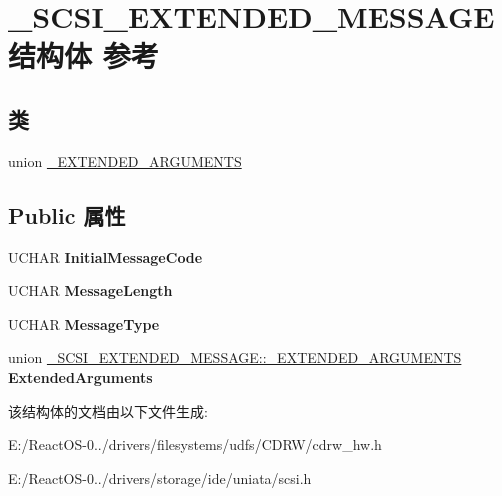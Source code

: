 \hypertarget{struct___s_c_s_i___e_x_t_e_n_d_e_d___m_e_s_s_a_g_e}{}\section{\+\_\+\+S\+C\+S\+I\+\_\+\+E\+X\+T\+E\+N\+D\+E\+D\+\_\+\+M\+E\+S\+S\+A\+G\+E结构体 参考}
\label{struct___s_c_s_i___e_x_t_e_n_d_e_d___m_e_s_s_a_g_e}
\subsection*{类}
\begin{DoxyCompactItemize}
\item 
union \hyperlink{union___s_c_s_i___e_x_t_e_n_d_e_d___m_e_s_s_a_g_e_1_1___e_x_t_e_n_d_e_d___a_r_g_u_m_e_n_t_s}{\+\_\+\+E\+X\+T\+E\+N\+D\+E\+D\+\_\+\+A\+R\+G\+U\+M\+E\+N\+TS}
\end{DoxyCompactItemize}
\subsection*{Public 属性}
\begin{DoxyCompactItemize}
\item 
\mbox{\label{struct___s_c_s_i___e_x_t_e_n_d_e_d___m_e_s_s_a_g_e_a3b00773a141e84dd943eed392e27b71b}} 
U\+C\+H\+AR {\bfseries Initial\+Message\+Code}
\item 
\mbox{\label{struct___s_c_s_i___e_x_t_e_n_d_e_d___m_e_s_s_a_g_e_a7496ac3fa1ec621221225ea8cf238159}} 
U\+C\+H\+AR {\bfseries Message\+Length}
\item 
\mbox{\label{struct___s_c_s_i___e_x_t_e_n_d_e_d___m_e_s_s_a_g_e_a28f0fb77e2193ec51d198f1ac33e434b}} 
U\+C\+H\+AR {\bfseries Message\+Type}
\item 
\mbox{\label{struct___s_c_s_i___e_x_t_e_n_d_e_d___m_e_s_s_a_g_e_a59a48793e96a166687fc36b3e3d5a3b5}} 
union \hyperlink{union___s_c_s_i___e_x_t_e_n_d_e_d___m_e_s_s_a_g_e_1_1___e_x_t_e_n_d_e_d___a_r_g_u_m_e_n_t_s}{\+\_\+\+S\+C\+S\+I\+\_\+\+E\+X\+T\+E\+N\+D\+E\+D\+\_\+\+M\+E\+S\+S\+A\+G\+E\+::\+\_\+\+E\+X\+T\+E\+N\+D\+E\+D\+\_\+\+A\+R\+G\+U\+M\+E\+N\+TS} {\bfseries Extended\+Arguments}
\end{DoxyCompactItemize}


该结构体的文档由以下文件生成\+:\begin{DoxyCompactItemize}
\item 
E\+:/\+React\+O\+S-\/0../drivers/filesystems/udfs/\+C\+D\+R\+W/cdrw\+\_\+hw.\+h\item 
E\+:/\+React\+O\+S-\/0../drivers/storage/ide/uniata/scsi.\+h\end{DoxyCompactItemize}
